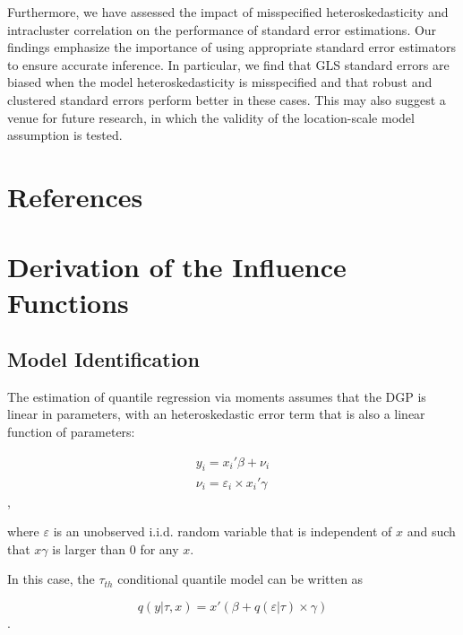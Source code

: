 \documentclass[
  authoryear,
  review,
  1p]{elsarticle}
\begin{document}
Furthermore, we have assessed the impact of misspecified
heteroskedasticity and intracluster correlation on the performance of
standard error estimations. Our findings emphasize the importance of
using appropriate standard error estimators to ensure accurate
inference. In particular, we find that GLS standard errors are biased
when the model heteroskedasticity is misspecified and that robust and
clustered standard errors perform better in these cases. This may also
suggest a venue for future research, in which the validity of the location-scale model assumption is tested.

\hypertarget{references}{%
\section*{References}\label{references}}

\renewcommand{\bibsection}{}


\newpage{}

\appendix

\hypertarget{derivation-of-the-influence-functions}{%
\section{Derivation of the Influence
Functions}\label{derivation-of-the-influence-functions}}

\hypertarget{model-identification}{%
\subsection{Model Identification}\label{model-identification}}

The estimation of quantile regression via moments assumes that the DGP
is linear in parameters, with an heteroskedastic error term that is also
a linear function of parameters:

\[\begin{aligned}
y_i = x_i'\beta + \nu_i \\
\nu_i = \varepsilon_i \times x_i'\gamma
\end{aligned}
\],

where \(\varepsilon\) is an unobserved i.i.d. random variable that is
independent of \(x\) and such that \(x\gamma\) is larger than 0 for
any \(x\).

In this case, the \(\tau_{th}\) conditional quantile model can be
written as

\[q(y|\tau,x) = x'(\beta + q(\varepsilon |\tau) \times \gamma)\].
\end{document}
